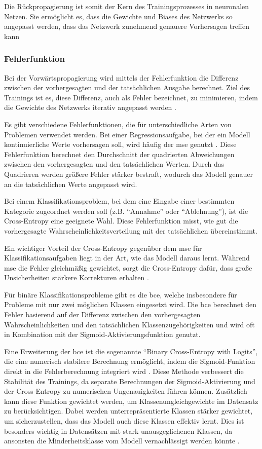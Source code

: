 Die Rückpropagierung ist somit der Kern des Trainingsprozesses in neuronalen Netzen. Sie ermöglicht es, dass die Gewichte und Biases des Netzwerks so angepasst werden, dass das Netzwerk zunehmend genauere Vorhersagen treffen kann \cite{LeCun2015}

\subsubsection{Fehlerfunktion}
\label{sec:lossfunction}
Bei der Vorwärtspropagierung wird mittels der Fehlerfunktion die Differenz zwischen der vorhergesagten und der tatsächlichen Ausgabe berechnet. Ziel des Trainings ist es, diese Differenz, auch als Fehler bezeichnet, zu minimieren, indem die Gewichte des Netzwerks iterativ angepasst werden \cite{Goodfellow2016}.

Es gibt verschiedene Fehlerfunktionen, die für unterschiedliche Arten von Problemen verwendet werden.
Bei einer Regressionsaufgabe, bei der ein Modell kontinuierliche Werte vorhersagen soll, wird häufig der \gls{mse} genutzt \cite{Goodfellow2016}. 
Diese Fehlerfunktion berechnet den Durchschnitt der quadrierten Abweichungen zwischen den vorhergesagten und den tatsächlichen Werten. Durch das Quadrieren werden größere Fehler stärker bestraft, wodurch das Modell genauer an die tatsächlichen Werte angepasst wird.

Bei einem Klassifikationsproblem, bei dem eine Eingabe einer bestimmten Kategorie zugeordnet werden soll (z.B. \enquote{Annahme} oder \enquote{Ablehnung}), ist die Cross-Entropy eine geeignete Wahl. Diese Fehlerfunktion misst, wie gut die vorhergesagte Wahrscheinlichkeitsverteilung mit der tatsächlichen übereinstimmt.

Ein wichtiger Vorteil der Cross-Entropy gegenüber dem \gls{mse} für Klassifikationsaufgaben liegt in der Art, wie das Modell daraus lernt. Während \gls{mse} die Fehler gleichmäßig gewichtet, sorgt die Cross-Entropy dafür, dass große Unsicherheiten stärkere Korrekturen erhalten \cite{Goodfellow2016}.

Für binäre Klassifikationsprobleme gibt es die \gls{bce}, welche insbesondere für Probleme mit nur zwei möglichen Klassen eingesetzt wird. Die \gls{bce} berechnet den Fehler basierend auf der Differenz zwischen den vorhergesagten Wahrscheinlichkeiten und den tatsächlichen Klassenzugehörigkeiten und wird oft in Kombination mit der Sigmoid-Aktivierungsfunktion genutzt.

Eine Erweiterung der \gls{bce} ist die sogenannte \enquote{Binary Cross-Entropy with Logits}, die eine numerisch stabilere Berechnung ermöglicht, indem die Sigmoid-Funktion direkt in die Fehlerberechnung integriert wird \cite{Goodfellow2016}. 
Diese Methode verbessert die Stabilität des Trainings, da separate Berechnungen der Sigmoid-Aktivierung und der Cross-Entropy zu numerischen Ungenauigkeiten führen können. Zusätzlich kann diese Funktion gewichtet werden, um Klassenungleichgewichte im Datensatz zu berücksichtigen. Dabei werden unterrepräsentierte Klassen stärker gewichtet, um sicherzustellen, dass das Modell auch diese Klassen effektiv lernt. Dies ist besonders wichtig in Datensätzen mit stark unausgeglichenen Klassen, da ansonsten die Minderheitsklasse vom Modell vernachlässigt werden könnte \cite{Hastie2009}.

